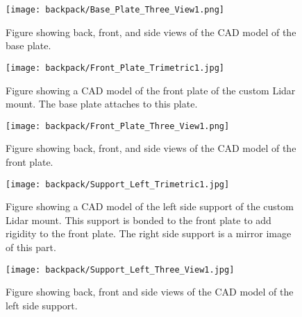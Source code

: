 \begin{figure}
\centering
\texttt{[image: backpack/Base\_Plate\_Three\_View1.png]}
\caption{Figure showing back, front, and side views of the CAD model of the
         base plate.}
\label{fig:nao_lidar_mount_baseplate_three_view1}
\end{figure}

\begin{figure}
\centering
\texttt{[image: backpack/Front\_Plate\_Trimetric1.jpg]}
\caption{Figure showing a CAD model of the front plate of the custom Lidar
         mount. The base plate attaches to this plate.}
\label{fig:nao_lidar_mount_frontplate_trimetric1}
\end{figure}

\begin{figure}
\centering
\texttt{[image: backpack/Front\_Plate\_Three\_View1.png]}
\caption{Figure showing back, front, and side views of the CAD model of the
         front plate.}
\label{fig:nao_lidar_mount_frontplate_three_view1}
\end{figure}

\begin{figure}
\centering
\texttt{[image: backpack/Support\_Left\_Trimetric1.jpg]}
\caption{Figure showing a CAD model of the left side support of the custom
         Lidar mount. This support is bonded to the front plate to add rigidity
         to the front plate. The right side support is a mirror image of this
         part.}
\label{fig:nao_lidar_mount_supportleft_trimetric1}
\end{figure}

\begin{figure}
\centering
\texttt{[image: backpack/Support\_Left\_Three\_View1.jpg]}
\caption{Figure showing back, front and side views of the CAD model of the left
         side support.}
\label{fig:nao_lidar_mount_supportleft_three_view1}
\end{figure}


